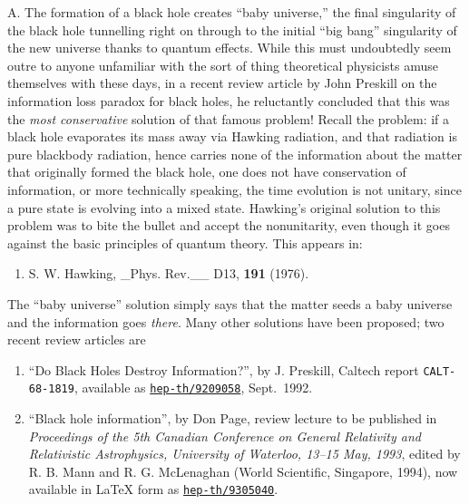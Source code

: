 \documentclass{article}
\def\tightlist{}
\begin{document}
A. The formation of a black hole creates ``baby universe,'' the final
singularity of the black hole tunnelling right on through to the initial
``big bang'' singularity of the new universe thanks to quantum effects.
While this must undoubtedly seem outre to anyone unfamiliar with the
sort of thing theoretical physicists amuse themselves with these days,
in a recent review article by John Preskill on the information loss
paradox for black holes, he reluctantly concluded that this was the
\emph{most conservative} solution of that famous problem! Recall the
problem: if a black hole evaporates its mass away via Hawking radiation,
and that radiation is pure blackbody radiation, hence carries none of
the information about the matter that originally formed the black hole,
one does not have conservation of information, or more technically
speaking, the time evolution is not unitary, since a pure state is
evolving into a mixed state. Hawking's original solution to this problem
was to bite the bullet and accept the nonunitarity, even though it goes
against the basic principles of quantum theory. This appears in:

\begin{enumerate}
\def\labelenumi{\arabic{enumi})}
\setcounter{enumi}{1}
\tightlist
\item
  S. W. Hawking, \_Phys. Rev.\_\_ D13, \textbf{191} (1976).
\end{enumerate}

The ``baby universe'' solution simply says that the matter seeds a baby
universe and the information goes \emph{there}. Many other solutions
have been proposed; two recent review articles are

\begin{enumerate}
\def\labelenumi{\arabic{enumi})}
\setcounter{enumi}{2}
\item
  ``Do Black Holes Destroy Information?'', by J. Preskill, Caltech
  report \texttt{CALT-68-1819}, available as
  \href{http://xxx.lanl.gov/abs/hep-th/9209058}{\texttt{hep-th/9209058}},
  Sept.~1992.
\item
  ``Black hole information'', by Don Page, review lecture to be
  published in \emph{Proceedings of the 5th Canadian Conference on
  General Relativity and Relativistic Astrophysics, University of
  Waterloo, 13--15 May, 1993}, edited by R. B. Mann and R. G. McLenaghan
  (World Scientific, Singapore, 1994), now available in LaTeX form as
  \href{http://xxx.lanl.gov/abs/hep-th/9305040}{\texttt{hep-th/9305040}}.
\end{enumerate}
\end{document}
